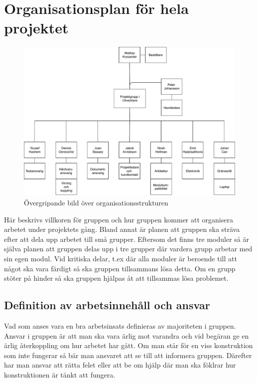 \documentclass[projektplan/plan.tex]{subfiles}
\begin{document}
\section{Organisationsplan för hela projektet}
\begin{figure}[h]
    \centering
    \includegraphics[width=0.6\linewidth]{projektplan/figures/orgplan.pdf}
    \caption{Övergripande bild över organisationsstrukturen}
    \label{fig:orgplan}
\end{figure}

Här beskrivs villkoren för gruppen och hur gruppen  kommer att organisera arbetet under projektets gång.
Bland annat är planen att gruppen ska sträva efter att dela upp arbetet till
små grupper. Eftersom det finns tre moduler så är själva planen att gruppen
delas upp i tre grupper där vardera grupp arbetar med sin egen modul. Vid
kritiska delar, t.ex där alla moduler är beroende till att något ska vara
färdigt så ska gruppen tillsammans lösa detta. Om en grupp stöter på hinder
så ska gruppen hjälpas åt att tillsammas lösa problemet.

\subsection{Definition av arbetsinnehåll och ansvar}
Vad som anses vara en bra arbetsinsats definieras av majoriteten i gruppen.
Ansvar i gruppen är att man ska vara ärlig mot varandra och vid begäran ge en 
ärlig återkoppling om hur arbetet har gått. Om man står för en viss
konstruktion som inte fungerar så bär man ansvaret att se till att informera
gruppen. Därefter har man ansvar att rätta felet eller att be om hjälp där
man ska föklrar hur konstruktionen är tänkt att fungera.
\end{document}
